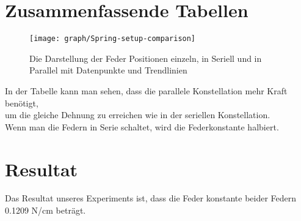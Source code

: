 \documentclass[../main.tex]{subfiles} %
\begin{document}
\section{Zusammenfassende Tabellen}\label{sec:zusammenfassende-tabellen}
    \begin{figure}[H]
        \centering
        \texttt{[image: graph/Spring-setup-comparison]}
        \caption{Die Darstellung der Feder Positionen einzeln, in Seriell und in Parallel mit Datenpunkte und Trendlinien}\label{fig:figure}
    \end{figure}
    In der Tabelle kann man sehen, dass die parallele Konstellation mehr Kraft benötigt, \\
    um die gleiche Dehnung zu erreichen wie in der seriellen Konstellation.\\
    Wenn man die Federn in Serie schaltet, wird die Federkonstante halbiert.
    \section{Resultat}\label{subsec:resultat}
    Das Resultat unseres Experiments ist, dass die Feder konstante beider Federn 0.1209 N/cm beträgt.
\end{document}
